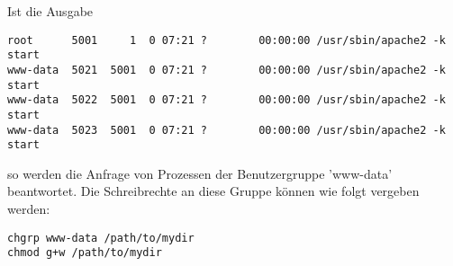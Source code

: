 Ist die Ausgabe
\begin{lstlisting}
root      5001     1  0 07:21 ?        00:00:00 /usr/sbin/apache2 -k start
www-data  5021  5001  0 07:21 ?        00:00:00 /usr/sbin/apache2 -k start
www-data  5022  5001  0 07:21 ?        00:00:00 /usr/sbin/apache2 -k start
www-data  5023  5001  0 07:21 ?        00:00:00 /usr/sbin/apache2 -k start
\end{lstlisting}

so werden die Anfrage von Prozessen der Benutzergruppe 'www-data' beantwortet. Die Schreibrechte an diese Gruppe können wie folgt vergeben werden:
\begin{lstlisting}
chgrp www-data /path/to/mydir
chmod g+w /path/to/mydir
\end{lstlisting}












